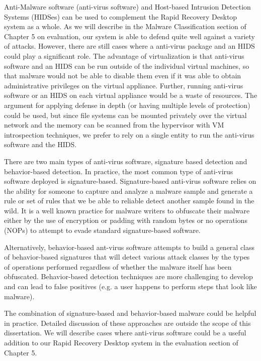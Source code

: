 Anti-Malware software (anti-virus software) and Host-based Intrusion Detection Systems (HIDSes) can be used to complement the Rapid Recovery Desktop system as a whole. As we will describe in the Malware Classification section of Chapter 5 on evaluation, our system is able to defend quite well against a variety of attacks. However, there are still cases where a anti-virus package and an HIDS could play a significant role. The advantage of virtualization is that anti-virus software and an HIDS can be run outside of the individual virtual machines, so that malware would not be able to disable them even if it was able to obtain administrative privileges on the virtual appliance. Further, running anti-virus software or an HIDS on each virtual appliance would be a waste of resources. The argument for applying defense in depth (or having multiple levels of protection) could be used, but since file systems can be mounted privately over the virtual network and the memory can be scanned from the hypervisor with VM introspection techniques, we prefer to rely on a single entity to run the anti-virus software and the HIDS.

There are two main types of anti-virus software, signature based detection and behavior-based detection. In practice, the most common type of anti-virus software deployed is signature-based. Signature-based anti-virus software relies on the ability for someone to capture and analyze a malware sample and generate a rule or set of rules that we be able to reliable detect another sample found in the wild. It is a well known practice for malware writers to obfuscate their malware either by the use of encryption or padding with random bytes or no operations (NOPs) to attempt to evade standard signature-based software.

Alternatively, behavior-based ant-virus software attempts to build a general class of behavior-based signatures that will detect various attack classes by the types of operations performed regardless of whether the malware itself has been obfuscated. Behavior-based detection techniques are more challenging to develop and can lead to false positives (e.g. a user happens to perform steps that look like malware).

The combination of signature-based and behavior-based malware could be helpful in practice. Detailed discussion of these approaches are outside the scope of this dissertation. We will describe cases where anti-virus software could be a useful addition to our Rapid Recovery Desktop system in the evaluation section of Chapter 5.

